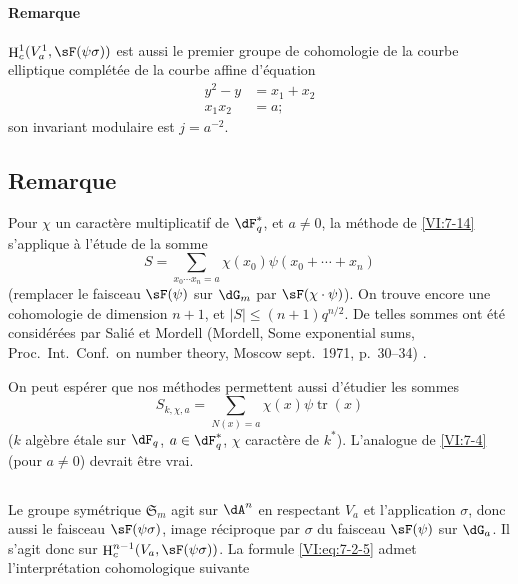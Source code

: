 \documentclass[oneside]{book}
\DeclareMathOperator{\h}{H}
\DeclareMathOperator{\tr}{tr}
\theoremstyle{sga-source}
\theoremstyle{sga-source-dash}
\theoremstyle{sga-source-dotdash}
\theoremstyle{sga-source-number-note-dash}
\theoremstyle{sga-source-note-number-dotdash}
\theoremstyle{sga-source-example-dotdash}
\theoremstyle{sga-source-inline-number}
\theoremstyle{sga-source-bare-number}
\theoremstyle{sga-source}
\newcommand{\PrintPage}[1]{}\newcommand{\MathPage}[1]{}\newcommand{\PrintCite}[2]{#1}\newcommand{\var}[3]{#1}
\begin{document}
\paragraph{Remarque}

$\h_c^1(V_a^1,\sF(\psi\sigma))$ est aussi le premier groupe de cohomologie de 
la courbe elliptique complétée de la courbe affine d'équation 
\begin{align*}
  y^2-y &= x_1+x_2 \\
  x_1 x_2 &= a \text{;} 
\end{align*}
son invariant modulaire est $j=a^{-2}$. 





\PrintPage{228}
\subsection{Remarque}\label{VI:7-18}

Pour $\chi$ un caractère multiplicatif de $\dF_q^\ast$, et $a\ne 0$, la 
méthode de \ref{VI:7-14} s'applique à l'étude de la somme 
\[
  S = \sum_{x_0\dotsm x_n = a} \chi(x_0) \psi(x_0+\cdots + x_n) 
\]
(remplacer le faisceau $\sF(\psi)$ sur $\dG_m$ par $\sF(\chi\cdot \psi)$). On 
trouve encore une cohomologie de dimension $n+1$, et 
$|S|\leqslant (n+1)q^{n/2}$. De telles sommes ont été considérées par 
Salié et Mordell (Mordell, Some exponential sums, Proc.~Int.~Conf.~on number theory, Moscow sept.~1971, p.~30--34) \cite{mo73}.

On peut espérer que nos méthodes permettent aussi d'étudier les sommes 
\[
  S_{k,\chi,a} = \sum_{N(x)=a} \chi(x) \psi \tr(x) 
\]
($k$ algèbre étale sur $\dF_q$, $a\in \dF_q^\ast$, $\chi$ caractère de 
$k^\ast$). L'analogue de \ref{VI:7-4} (pour $a\ne 0$) devrait être vrai. 





\subsection{}\label{VI:7-19}

\var{Le groupe symétrique $\mathfrak{S}_m$}{Le groupe symétrique $\mathfrak{S}_n$}{S45-SOL-0966} agit sur $\dA^n$ en respectant $V_a$ et 
l'application $\sigma$, donc aussi le faisceau $\sF(\psi\sigma)$, image 
réciproque par $\sigma$ du faisceau $\sF(\psi)$ sur $\dG_a$. \var{Il s'agit donc sur}{Il agit donc sur}{S45-SOL-0969} $\h_c^{n-1}(V_a,\sF(\psi\sigma))$. La formule \eqref{VI:eq:7-2-5} admet 
l'interprétation cohomologique suivante
\end{document}
